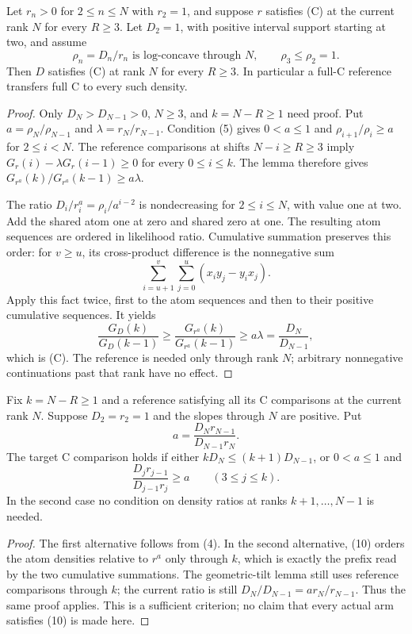 \begin{theorem}
Let $r_n>0$ for $2\le n\le N$ with $r_2=1$, and suppose $r$
satisfies (C) at the current rank $N$ for every $R\ge3$.
Let $D_2=1$, with positive interval support starting at two, and assume
\[
 \rho_n=D_n/r_n\text{ is log-concave through }N,\qquad
                         \rho_3\le\rho_2=1.               \tag{5}
\]
Then $D$ satisfies (C) at rank $N$ for every $R\ge3$.
In particular a full-C reference transfers full C to every such density.
\end{theorem}
\begin{proof}
Only $D_N>D_{N-1}>0$, $N\ge3$, and $k=N-R\ge1$ need proof.
Put $a=\rho_N/\rho_{N-1}$ and $\lambda=r_N/r_{N-1}$.
Condition (5) gives $0<a\le1$ and
$\rho_{i+1}/\rho_i\ge a$ for $2\le i<N$.
The reference comparisons at shifts $N-i\ge R\ge3$ imply
$G_r(i)-\lambda G_r(i-1)\ge0$ for every $0\le i\le k$.
The lemma therefore gives
$G_{r^a}(k)/G_{r^a}(k-1)\ge a\lambda$.

The ratio $D_i/r^a_i=\rho_i/a^{i-2}$ is nondecreasing for
$2\le i\le N$, with value one at two.  Add the shared atom one
at zero and shared zero at one.  The resulting atom sequences are
ordered in likelihood ratio.  Cumulative summation preserves this order:
for $v\ge u$, its cross-product difference is the nonnegative sum
\[
 \sum_{i=u+1}^{v}\sum_{j=0}^{u}(x_iy_j-y_ix_j).
\]
Apply this fact twice, first to the atom sequences and then to their
positive cumulative sequences.  It yields
\[
 \frac{G_D(k)}{G_D(k-1)}\ge
 \frac{G_{r^a}(k)}{G_{r^a}(k-1)}\ge a\lambda
                         =\frac{D_N}{D_{N-1}},
\]
which is (C).  The reference is needed only through rank $N$;
arbitrary nonnegative continuations past that rank have no effect.
\end{proof}

\begin{corollary}
Fix $k=N-R\ge1$ and a reference satisfying all its C comparisons
at the current rank $N$.  Suppose $D_2=r_2=1$ and the slopes
through $N$ are positive.  Put
\[
 a=\frac{D_Nr_{N-1}}{D_{N-1}r_N}.
\]
The target C comparison holds if either
$kD_N\le(k+1)D_{N-1}$, or $0<a\le1$ and
\[
 \frac{D_jr_{j-1}}{D_{j-1}r_j}\ge a\qquad(3\le j\le k).   \tag{10}
\]
In the second case no condition on density ratios at ranks
$k+1,\ldots,N-1$ is needed.
\end{corollary}
\begin{proof}
The first alternative follows from (4).  In the second alternative,
(10) orders the atom densities relative to $r^a$ only through $k$,
which is exactly the prefix read by the two cumulative summations.
The geometric-tilt lemma still uses reference comparisons through $k$;
the current ratio is still $D_N/D_{N-1}=a r_N/r_{N-1}$.
Thus the same proof applies.  This is a sufficient criterion; no claim
that every actual arm satisfies (10) is made here.
\end{proof}

